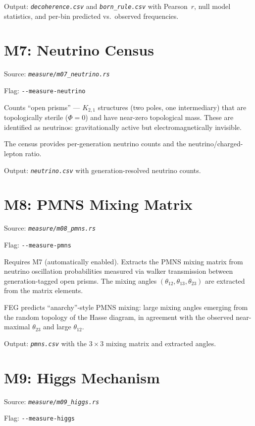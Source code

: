 \documentclass[11pt, a4paper, openany]{book}
\newcommand{\flag}[1]{\texttt{-{}-#1}}
\newcommand{\file}[1]{\texttt{\itshape #1}}
\begin{document}
Output: \file{decoherence.csv} and \file{born\_rule.csv} with Pearson~$r$,
null model statistics, and per-bin predicted vs.\ observed frequencies.

\section{M7: Neutrino Census}

Source: \file{measure/m07\_neutrino.rs}

Flag: \flag{measure-neutrino}

Counts ``open prisms'' --- $K_{2,1}$ structures (two poles, one intermediary)
that are topologically sterile ($\Phi = 0$) and have near-zero topological mass.
These are identified as neutrinos: gravitationally active but electromagnetically
invisible.

The census provides per-generation neutrino counts and the
neutrino/charged-lepton ratio.

Output: \file{neutrino.csv} with generation-resolved neutrino counts.

\section{M8: PMNS Mixing Matrix}

Source: \file{measure/m08\_pmns.rs}

Flag: \flag{measure-pmns}

Requires M7 (automatically enabled).  Extracts the PMNS mixing matrix from
neutrino oscillation probabilities measured via walker transmission between
generation-tagged open prisms.  The mixing angles $(\theta_{12}, \theta_{13},
\theta_{23})$ are extracted from the matrix elements.

\begin{result}
  FEG predicts ``anarchy''-style PMNS mixing: large mixing angles emerging from
  the random topology of the Hasse diagram, in agreement with the observed
  near-maximal $\theta_{23}$ and large $\theta_{12}$.
\end{result}

Output: \file{pmns.csv} with the $3 \times 3$ mixing matrix and extracted angles.

\section{M9: Higgs Mechanism}

Source: \file{measure/m09\_higgs.rs}

Flag: \flag{measure-higgs}
\end{document}
